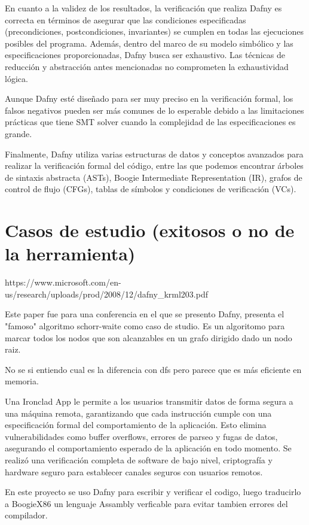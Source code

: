 \documentclass[runningheads]{llncs}
\begin{document}
En cuanto a la validez de los resultados, la verificación que realiza Dafny es correcta en términos de asegurar que las condiciones
especificadas (precondiciones, postcondiciones, invariantes) se cumplen en todas las ejecuciones posibles del programa. 
Además, dentro del marco de su modelo simbólico y las especificaciones proporcionadas,
Dafny busca ser exhaustivo. Las técnicas de reducción y abstracción antes mencionadas no comprometen la exhaustividad lógica.

Aunque Dafny esté diseñado para ser muy preciso en la verificación formal, 
los falsos negativos pueden ser más comunes de lo esperable debido a las limitaciones prácticas que tiene SMT solver
cuando la complejidad de las especificaciones es grande.

Finalmente, Dafny utiliza varias estructuras de datos y conceptos avanzados para realizar la verificación formal del código,
entre las que podemos encontrar árboles de sintaxis abstracta (ASTs), Boogie Intermediate Representation (IR), grafos de control de flujo (CFGs),
tablas de símbolos y condiciones de verificación (VCs).

\section{Casos de estudio (exitosos o no de la herramienta)}

https://www.microsoft.com/en-us/research/uploads/prod/2008/12/dafny\_krml203.pdf

Este paper fue para una conferencia en el que se presento Dafny, presenta el "famoso" algoritmo schorr-waite como caso de studio. Es un algoritomo para marcar todos los nodos que son alcanzables en un grafo dirigido dado un nodo raiz.

No se si entiendo cual es la diferencia con dfs pero parece que es más eficiente en memoria.

Una Ironclad\cite{hawblitzel2014ironclad} App le permite a los usuarios transmitir datos de forma segura a una máquina remota, garantizando que cada instrucción cumple con una especificación formal del comportamiento de la aplicación. Esto elimina vulnerabilidades como buffer overflows, errores de parseo y fugas de datos, asegurando el comportamiento esperado de la aplicación en todo momento. Se realizó una verificación completa de software de bajo nivel, criptografía y hardware seguro para establecer canales seguros con usuarios remotos.

En este proyecto se uso Dafny para escribir y verificar el codigo, luego traducirlo a BoogieX86 un lenguaje Assambly verficable para evitar tambien errores del compilador.
\end{document}
